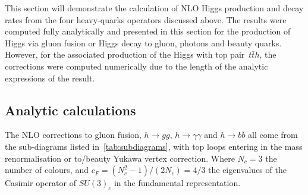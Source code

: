This section will demonstrate the calculation of NLO Higgs production and decay rates from the four heavy-quarks operators discussed above. The results were computed fully analytically and presented in this section for the production of Higgs via gluon fusion or Higgs decay to gluon, photons and beauty quarks. However, for the associated production of the Higgs with top pair~$ t\bar{t} h$, the corrections were computed numerically due to the length of the analytic expressions of the result.

\subsection{Analytic calculations}
\par The NLO corrections to gluon fusion, $h \to gg$, $h\to \gamma \gamma$ and $ h \to b \bar{b}$ all come from the sub-diagrams listed in~\autoref{tab:subdiagrams}, with top loops entering in the mass renormalisation or to/beauty Yukawa vertex correction. Where $N_c=3$ the number of colours, and $c_F=(N_c^2-1)/(2N_c)=4/3$ the eigenvalues of the Casimir operator of $SU(3)_c$ in the fundamental representation. 
